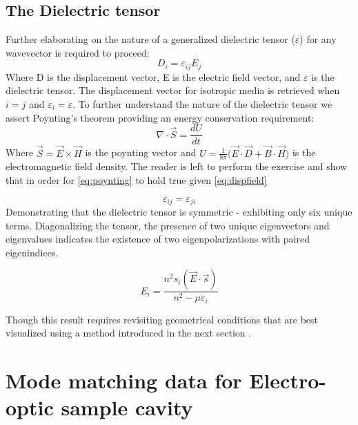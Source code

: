 \subsection{The Dielectric tensor}
Further elaborating on the nature of a generalized dielectric tensor ($\varepsilon$) for any wavevector is required to proceed:
\begin{equation}\label{eq:dispfield}
D_i = \varepsilon_{ij}E_j
\end{equation}
Where D is the displacement vector, E is the electric field vector, and $\varepsilon$ is the dielectric tensor. The displacement vector for isotropic media is retrieved when $i = j$ and $\varepsilon_i = \varepsilon$. To further understand the nature of the dielectric tensor we assert Poynting's theorem providing an energy conservation requirement:
\begin{equation}\label{eq:poynting}
\nabla \cdot \vec{S} = \frac{dU}{dt}
\end{equation}
Where $\vec{S} = \vec{E} \times \vec{H}$ is the poynting vector and $U = \frac{1}{8 \pi} \big( \vec{E} \cdot \vec{D} + \vec{B} \cdot \vec{H} \big)$ is the electromagnetic field density. The reader is left to perform the exercise and show that in order for \autoref{eq:poynting} to hold true given \autoref{eq:dispfield}


\begin{equation}
\varepsilon_{ij} = \varepsilon_{ji}
\end{equation}
Demonstrating that the dielectric tensor is symmetric - exhibiting only six unique terms. Diagonalizing the tensor, the presence of two unique eigenvectors and eigenvalues indicates the existence of two eigenpolarizations with paired eigenindices.

\begin{equation}\label{eq:modelec}
E_i = \frac{n^2 s_i (\vec{E}\cdot\vec{s})}{n^2 - \mu \varepsilon_i}
\end{equation}

Though this result requires revisiting geometrical conditions that are best visualized using a method introduced in the next section \cite{nye}. 





\section{Mode matching data for Electro-optic sample cavity}

